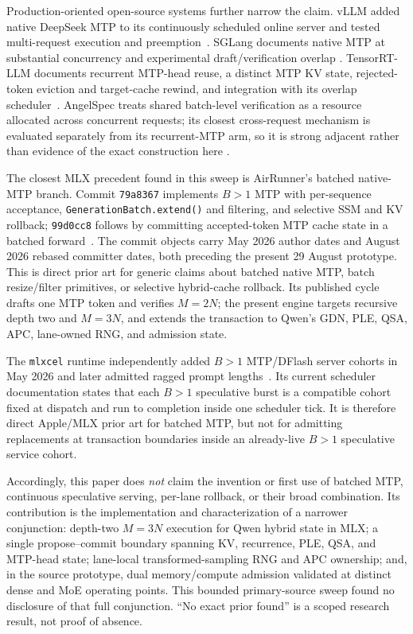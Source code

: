 \documentclass[10pt,twocolumn]{article}
\begin{document}
Production-oriented open-source systems further narrow the claim.  vLLM added
native DeepSeek MTP to its continuously scheduled online server and tested
multi-request execution and preemption~\cite{vllmmtp}.  SGLang documents native
MTP at substantial concurrency and experimental draft/verification overlap
\cite{sglangmtp}.  TensorRT-LLM documents recurrent MTP-head reuse, a distinct
MTP KV state, rejected-token eviction and target-cache rewind, and integration
with its overlap scheduler~\cite{trtmtp}.  AngelSpec treats shared batch-level
verification as a resource allocated across concurrent requests; its closest
cross-request mechanism is evaluated separately from its recurrent-MTP arm,
so it is strong adjacent rather than evidence of the exact construction here
\cite{angelspec2026}.

The closest MLX precedent found in this sweep is AirRunner's batched native-MTP
branch.  Commit \texttt{79a8367} implements $B>1$ MTP with per-sequence
acceptance, \texttt{GenerationBatch.extend()} and filtering, and selective SSM
and KV rollback; \texttt{99d0cc8} follows by committing accepted-token MTP
cache state in a batched forward~\cite{airrunnermtp}.  The commit objects carry
May 2026 author dates and August 2026 rebased committer dates, both preceding
the present 29 August prototype.  This is direct prior art for generic claims
about batched native MTP, batch resize/filter primitives, or selective
hybrid-cache rollback.  Its published cycle drafts one MTP token and verifies $M=2N$;
the present engine targets recursive depth two and $M=3N$, and extends the
transaction to Qwen's GDN, PLE, QSA, APC, lane-owned RNG, and admission state.

The \texttt{mlxcel} runtime independently added $B>1$ MTP/DFlash server cohorts
in May 2026 and later admitted ragged prompt lengths~\cite{mlxcelmtp}.  Its
current scheduler documentation states that each $B>1$ speculative burst is a
compatible cohort fixed at dispatch and run to completion inside one scheduler
tick.  It is therefore direct Apple/MLX prior art for batched MTP, but not for
admitting replacements at transaction boundaries inside an already-live
$B>1$ speculative service cohort.

Accordingly, this paper does \emph{not} claim the invention or first use of
batched MTP, continuous speculative serving, per-lane rollback, or their broad
combination.  Its contribution is the implementation and characterization of
a narrower conjunction: depth-two $M=3N$ execution for Qwen hybrid state in
MLX; a single propose--commit boundary spanning KV, recurrence, PLE, QSA, and
MTP-head state; lane-local transformed-sampling RNG and APC ownership; and, in
the source prototype, dual memory/compute admission validated at distinct dense
and MoE operating points.  This bounded primary-source sweep found no
disclosure of that full
conjunction.  ``No exact prior found'' is a scoped research result, not proof
of absence.
\end{document}
